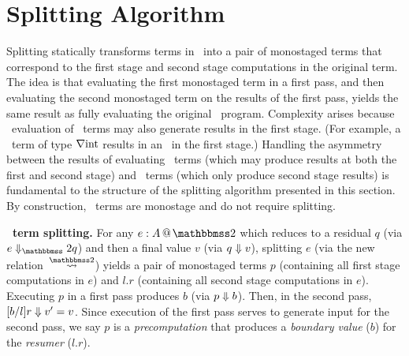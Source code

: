 
\section{Splitting Algorithm}
\label{sec:splitting}

%

\begin{abstrsyn}

Splitting statically transforms terms in \lang\ into a pair of
monostaged terms that correspond to the first stage and second stage
computations in the original term. The idea is that evaluating the
first monostaged term in a first pass, and then evaluating the second
monostaged term on the results of the first pass, yields the same
result as fully evaluating the original \lang\ program.  Complexity
arises because \lang\ evaluation of \bbonem\ terms may also generate
results in the first stage. (For example, a \bbonem\ term of type
$\nabla {\rm int}$ results in an \rmint\ in the first stage.) Handling the
asymmetry between the results of evaluating \bbonem\ terms (which may
produce results at both the first and second stage) and \bbtwo\ terms
(which only produce second stage results) is fundamental to the
structure of the splitting algorithm presented in this section.  By
construction, \bbonep\ terms are monostage and do not require
splitting.

\textbf{\bbtwo\ term splitting.}  For any $\coltwo e A$ which reduces
to a residual $q$ (via $\diatwo e q$) and then a final value $v$ (via
${q} \Downarrow {v}$), splitting $e$ (via the new relation~$\splittwosym$)
yields a pair of monostaged terms $p$ (containing all first stage
computations in $e$) and $l.r$ (containing all second stage
computations in $e$). Executing $p$ in a first pass produces $b$ (via
${p} \Downarrow {b}$). Then, in the second pass, ${[b/l]r} \Downarrow {v'} = v$.
Since execution of the first pass serves to generate input for the
second pass, we say $p$ is a {\em precomputation} that produces a {\em
  boundary value} ($b$) for the {\em resumer} ($l.r$).






\end{abstrsyn}
